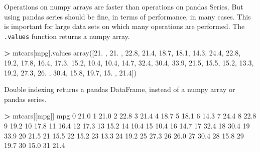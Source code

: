 \documentclass[
]{book}
\newenvironment{Shaded}{\begin{snugshade}}{\end{snugshade}}
\newcommand{\DecValTok}[1]{\textcolor[rgb]{0.00,0.00,0.81}{#1}}
\newcommand{\FloatTok}[1]{\textcolor[rgb]{0.00,0.00,0.81}{#1}}
\newcommand{\NormalTok}[1]{#1}
\newcommand{\OperatorTok}[1]{\textcolor[rgb]{0.81,0.36,0.00}{\textbf{#1}}}
\newcommand{\StringTok}[1]{\textcolor[rgb]{0.31,0.60,0.02}{#1}}
\begin{document}
Operations on numpy arrays are faster than operations on pandas Series. But using pandas series should be fine, in terms of performance, in many cases. This is important for large data sets on which many operations are performed. The \texttt{.values} function returns a numpy array.

\begin{Shaded}
\begin{Highlighting}[]
\OperatorTok{\textgreater{}}\NormalTok{ mtcars[}\StringTok{\textquotesingle{}mpg\textquotesingle{}}\NormalTok{].values}
\NormalTok{array([}\FloatTok{21.}\NormalTok{ , }\FloatTok{21.}\NormalTok{ , }\FloatTok{22.8}\NormalTok{, }\FloatTok{21.4}\NormalTok{, }\FloatTok{18.7}\NormalTok{, }\FloatTok{18.1}\NormalTok{, }\FloatTok{14.3}\NormalTok{, }\FloatTok{24.4}\NormalTok{, }\FloatTok{22.8}\NormalTok{, }\FloatTok{19.2}\NormalTok{, }\FloatTok{17.8}\NormalTok{,}
       \FloatTok{16.4}\NormalTok{, }\FloatTok{17.3}\NormalTok{, }\FloatTok{15.2}\NormalTok{, }\FloatTok{10.4}\NormalTok{, }\FloatTok{10.4}\NormalTok{, }\FloatTok{14.7}\NormalTok{, }\FloatTok{32.4}\NormalTok{, }\FloatTok{30.4}\NormalTok{, }\FloatTok{33.9}\NormalTok{, }\FloatTok{21.5}\NormalTok{, }\FloatTok{15.5}\NormalTok{,}
       \FloatTok{15.2}\NormalTok{, }\FloatTok{13.3}\NormalTok{, }\FloatTok{19.2}\NormalTok{, }\FloatTok{27.3}\NormalTok{, }\FloatTok{26.}\NormalTok{ , }\FloatTok{30.4}\NormalTok{, }\FloatTok{15.8}\NormalTok{, }\FloatTok{19.7}\NormalTok{, }\FloatTok{15.}\NormalTok{ , }\FloatTok{21.4}\NormalTok{])}
\end{Highlighting}
\end{Shaded}

Double indexing returns a pandas DataFrame, instead of a numpy array or pandas series.

\begin{Shaded}
\begin{Highlighting}[]
\OperatorTok{\textgreater{}}\NormalTok{ mtcars[[}\StringTok{\textquotesingle{}mpg\textquotesingle{}}\NormalTok{]]}
\NormalTok{     mpg}
\DecValTok{0}   \FloatTok{21.0}
\DecValTok{1}   \FloatTok{21.0}
\DecValTok{2}   \FloatTok{22.8}
\DecValTok{3}   \FloatTok{21.4}
\DecValTok{4}   \FloatTok{18.7}
\DecValTok{5}   \FloatTok{18.1}
\DecValTok{6}   \FloatTok{14.3}
\DecValTok{7}   \FloatTok{24.4}
\DecValTok{8}   \FloatTok{22.8}
\DecValTok{9}   \FloatTok{19.2}
\DecValTok{10}  \FloatTok{17.8}
\DecValTok{11}  \FloatTok{16.4}
\DecValTok{12}  \FloatTok{17.3}
\DecValTok{13}  \FloatTok{15.2}
\DecValTok{14}  \FloatTok{10.4}
\DecValTok{15}  \FloatTok{10.4}
\DecValTok{16}  \FloatTok{14.7}
\DecValTok{17}  \FloatTok{32.4}
\DecValTok{18}  \FloatTok{30.4}
\DecValTok{19}  \FloatTok{33.9}
\DecValTok{20}  \FloatTok{21.5}
\DecValTok{21}  \FloatTok{15.5}
\DecValTok{22}  \FloatTok{15.2}
\DecValTok{23}  \FloatTok{13.3}
\DecValTok{24}  \FloatTok{19.2}
\DecValTok{25}  \FloatTok{27.3}
\DecValTok{26}  \FloatTok{26.0}
\DecValTok{27}  \FloatTok{30.4}
\DecValTok{28}  \FloatTok{15.8}
\DecValTok{29}  \FloatTok{19.7}
\DecValTok{30}  \FloatTok{15.0}
\DecValTok{31}  \FloatTok{21.4}
\end{Highlighting}
\end{Shaded}
\end{document}
